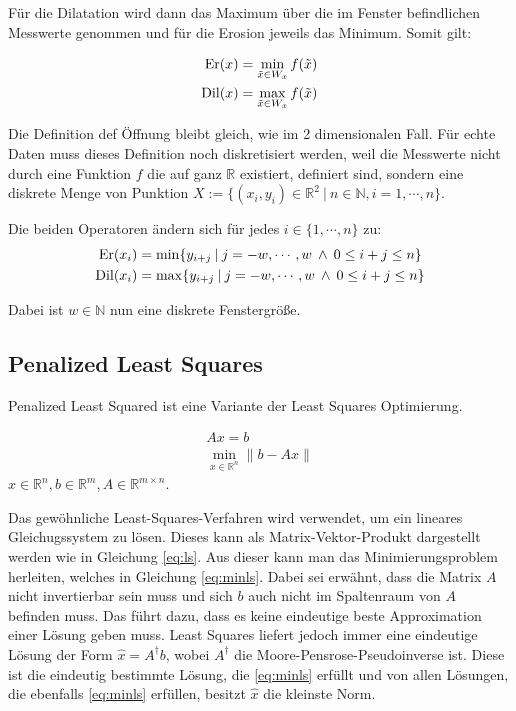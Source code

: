 \documentclass{article}
\newcommand{\R}[0]{\mathbb{R}}
\begin{document}
Für die Dilatation wird dann das Maximum über die im Fenster befindlichen Messwerte genommen und für die Erosion jeweils das Minimum. Somit gilt:

\begin{align}
    {\rm Er}(x)  &= \min\limits_{\tilde{x} \in W_x} f(\tilde{x}) \\
    {\rm Dil}(x) &= \max\limits_{\tilde{x} \in W_x} f(\tilde{x})
\end{align}

Die Definition def Öffnung bleibt gleich, wie im 2 dimensionalen Fall.
Für echte Daten muss dieses Definition noch diskretisiert werden, weil die Messwerte nicht durch eine Funktion $f$ die auf ganz $\R$ existiert, definiert sind, sondern eine diskrete Menge von Punktion $X := \{(x_i,y_i) \in \R^2 \: | \: n\in \mathbb{N}, i=1,\cdots,n \}$.

Die beiden Operatoren ändern sich für jedes $i\in \{1,\cdots,n\}$ zu:
\begin{align}
    {\rm Er}(x_i) &= \min \{y_{i+j} \: | \: j=-w,\cdots,w \: \land \: 0 \leq i + j \leq n\} \\
    {\rm Dil}(x_i)  &= \max \{y_{i+j} \: | \: j=-w,\cdots,w \: \land \: 0 \leq i + j \leq n\}
\end{align}

Dabei ist $w \in \mathbb{N}$ nun eine diskrete Fenstergröße.

\subsection{Penalized Least Squares}
Penalized Least Squared ist eine Variante der Least Squares Optimierung.

\begin{align}
    Ax = b \label{eq:ls} \\ 
    \min\limits_{x \in \R^n} \lVert b - Ax \rVert \label{eq:minls}
\end{align}
$x \in \R^n, b \in \R^m, A \in \R^{m\times n}$.

Das gewöhnliche Least-Squares-Verfahren wird verwendet, um ein lineares Gleichugssystem zu lösen. 
Dieses kann als Matrix-Vektor-Produkt dargestellt werden wie in Gleichung \ref{eq:ls}. 
Aus dieser kann man das Minimierungsproblem herleiten, welches in Gleichung \ref{eq:minls}.
Dabei sei erwähnt, dass die Matrix $A$ nicht invertierbar sein muss und sich $b$ auch nicht im Spaltenraum von $A$ befinden muss.
Das führt dazu, dass es keine eindeutige beste Approximation einer Lösung geben muss.
Least Squares liefert jedoch immer eine eindeutige Lösung der Form $\hat{x} = A^{\dagger} b$, wobei $A^{\dagger}$ die Moore-Pensrose-Pseudoinverse ist.
Diese ist die eindeutig bestimmte Lösung, die \ref{eq:minls} erfüllt und von allen Lösungen, die ebenfalls \ref{eq:minls} erfüllen, besitzt $\hat{x}$ die kleinste Norm.
\end{document}
